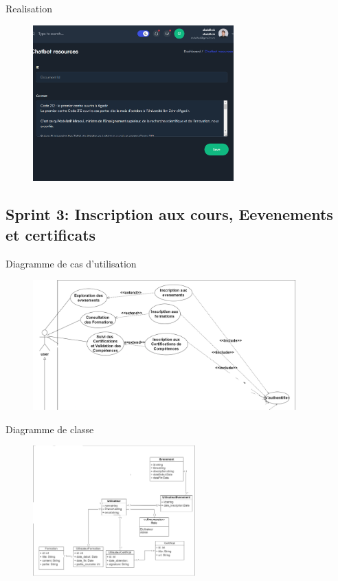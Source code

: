\documentclass[aspectratio=169]{beamer}
\begin{document}
\begin{frame}{Realisation}
    \begin{figure}[htpb]
        \centering
        \includegraphics[height=6cm]{pic/admin-doc.png}
    \end{figure}
\end{frame}



\subsection{Sprint 3: Inscription aux cours, Eevenements et
    certificats}
\begin{frame}{Diagramme de cas d'utilisation}

    \begin{figure}[htpb]
        \centering
        \includegraphics[height=5cm]{pic/sprint3-usecase.png}
    \end{figure}
\end{frame}

\begin{frame}{Diagramme de classe}

    \begin{figure}[htpb]
        \centering
        \includegraphics[height=5cm]{pic/sprint2-class.png}
    \end{figure}
\end{frame}
\end{document}
